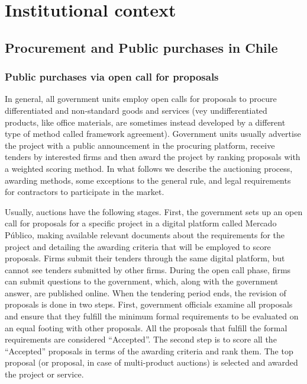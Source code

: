 \chapter{Institutional context}
\section{Procurement and Public purchases in Chile}
\subsection{Public purchases via open call for proposals}
In general, all government units employ open calls for proposals to procure differentiated and non-standard goods and services (vey undifferentiated products, like office materials, are sometimes instead developed by a different type of method called framework agreement).  Government units usually advertise the project with a public announcement in the procuring platform, receive tenders by interested firms and then award the project by ranking proposals with a weighted scoring method. In what follows we describe the auctioning process, awarding methods, some exceptions to the general rule, and legal requirements for contractors to participate in the market.

Usually, auctions have the following stages. First, the government sets up an open call for proposals for a specific project in a digital platform called Mercado Público, making available relevant documents about the requirements for the project and detailing the awarding criteria that will be employed to score proposals. Firms submit their tenders through the same digital platform, but cannot see tenders submitted by other firms. During the open call phase, firms can submit questions to the government, which, along with the government answer, are published online. When the tendering period ends, the revision of proposals is done in two steps. First, government officials examine all proposals and ensure that they fulfill the minimum formal requirements to be evaluated on an equal footing with other proposals. All the proposals that fulfill the formal requirements are considered “Accepted”. The second step is to score all the “Accepted” proposals in terms of the awarding criteria and rank them. The top proposal (or proposal, in case of multi-product auctions) is selected and awarded the project or service.

